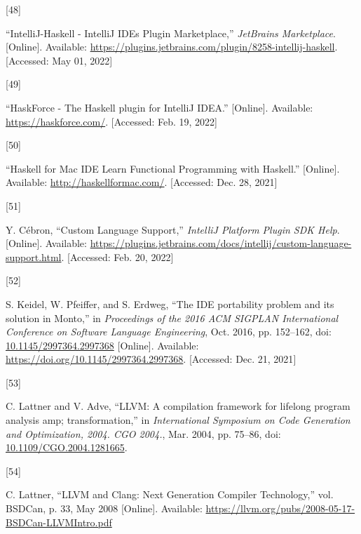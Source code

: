 \documentclass[
  a4paper,
  bibtex,
  english,
  nomenclature]{kthlatex/kththesis/kththesis}
\newlength{\cslhangindent}
\newlength{\csllabelwidth}
\newlength{\cslentryspacingunit} %
\newenvironment{CSLReferences}[2] %
 {%
  \setlength{\parindent}{0pt}
  \ifodd #1
  \let\oldpar\par
  \def\par{\hangindent=\cslhangindent\oldpar}
  \fi
  \setlength{\parskip}{#2\cslentryspacingunit}
 }%
 {}
\newcommand{\CSLLeftMargin}[1]{\parbox[t]{\csllabelwidth}{#1}}
\newcommand{\CSLRightInline}[1]{\parbox[t]{\linewidth - \csllabelwidth}{#1}\break}
\begin{document}
\begin{CSLReferences}{0}{0}
\leavevmode{}%
\CSLLeftMargin{{[}48{]} }
\CSLRightInline{{``{IntelliJ-Haskell} - {IntelliJ IDEs Plugin}
\textbar{} {Marketplace},''} \emph{JetBrains Marketplace}. {[}Online{]}.
Available:
\url{https://plugins.jetbrains.com/plugin/8258-intellij-haskell}.
{[}Accessed: May 01, 2022{]}}

\leavevmode{}%
\CSLLeftMargin{{[}49{]} }
\CSLRightInline{{``{HaskForce} - {The Haskell} plugin for {IntelliJ
IDEA}.''} {[}Online{]}. Available: \url{https://haskforce.com/}.
{[}Accessed: Feb. 19, 2022{]}}

\leavevmode{}%
\CSLLeftMargin{{[}50{]} }
\CSLRightInline{{``Haskell for {Mac IDE} \textemdash{} {Learn Functional
Programming} with {Haskell}.''} {[}Online{]}. Available:
\url{http://haskellformac.com/}. {[}Accessed: Dec. 28, 2021{]}}

\leavevmode{}%
\CSLLeftMargin{{[}51{]} }
\CSLRightInline{Y. Cébron, {``Custom {Language Support},''}
\emph{IntelliJ Platform Plugin SDK Help}. {[}Online{]}. Available:
\url{https://plugins.jetbrains.com/docs/intellij/custom-language-support.html}.
{[}Accessed: Feb. 20, 2022{]}}

\leavevmode{}%
\CSLLeftMargin{{[}52{]} }
\CSLRightInline{S. Keidel, W. Pfeiffer, and S. Erdweg, {``The {IDE}
portability problem and its solution in {Monto},''} in \emph{Proceedings
of the 2016 {ACM SIGPLAN International Conference} on {Software Language
Engineering}}, Oct. 2016, pp. 152--162, doi:
\href{https://doi.org/10.1145/2997364.2997368}{10.1145/2997364.2997368}
{[}Online{]}. Available: \url{https://doi.org/10.1145/2997364.2997368}.
{[}Accessed: Dec. 21, 2021{]}}

\leavevmode{}%
\CSLLeftMargin{{[}53{]} }
\CSLRightInline{C. Lattner and V. Adve, {``{LLVM}: A compilation
framework for lifelong program analysis amp; transformation,''} in
\emph{International {Symposium} on {Code Generation} and {Optimization},
2004. {CGO} 2004.}, Mar. 2004, pp. 75--86, doi:
\href{https://doi.org/10.1109/CGO.2004.1281665}{10.1109/CGO.2004.1281665}.
}

\leavevmode{}%
\CSLLeftMargin{{[}54{]} }
\CSLRightInline{C. Lattner, {``{LLVM} and {Clang}: {Next Generation
Compiler Technology},''} vol. BSDCan, p. 33, May 2008 {[}Online{]}.
Available: \url{https://llvm.org/pubs/2008-05-17-BSDCan-LLVMIntro.pdf}}


\end{CSLReferences}
\end{document}

